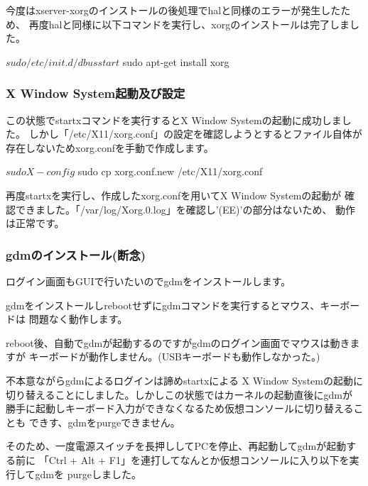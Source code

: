 \documentclass[mingoth,a4paper]{jsarticle}
\begin{document}
今度はxserver-xorgのインストールの後処理でhalと同様のエラーが発生したため、
再度halと同様に以下コマンドを実行し、xorgのインストールは完了しました。

\begin{commandline}
$ sudo /etc/init.d/dbus start
$ sudo apt-get install xorg
\end{commandline}

\subsubsection{X Window System起動及び設定}

この状態でstartxコマンドを実行するとX Window Systemの起動に成功しました。
しかし「/etc/X11/xorg.conf」の設定を確認しようとするとファイル自体が
存在しないためxorg.confを手動で作成します。

\begin{commandline}
$ sudo X -config
$ sudo cp xorg.conf.new /etc/X11/xorg.conf
\end{commandline}

再度startxを実行し、作成したxorg.confを用いてX Window Systemの起動が
確認できました。「/var/log/Xorg.0.log」を確認し'(EE)'の部分はないため、
動作は正常です。

\subsubsection{gdmのインストール(断念)}

ログイン画面もGUIで行いたいのでgdmをインストールします。


gdmをインストールしrebootせずにgdmコマンドを実行するとマウス、キーボードは
問題なく動作します。

reboot後、自動でgdmが起動するのですがgdmのログイン画面でマウスは動きますが
キーボードが動作しません。(USBキーボードも動作しなかった。)

不本意ながらgdmによるログインは諦めstartxによる X Window Systemの起動に
切り替えることにしました。しかしこの状態ではカーネルの起動直後にgdmが
勝手に起動しキーボード入力ができなくなるため仮想コンソールに切り替えることも
できす、gdmをpurgeできません。

そのため、一度電源スイッチを長押ししてPCを停止、再起動してgdmが起動する前に
「Ctrl + Alt + F1」を連打してなんとか仮想コンソールに入り以下を実行してgdmを
purgeしました。
\end{document}
